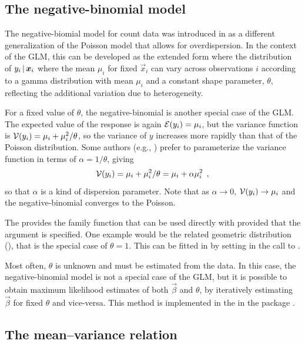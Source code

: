 \documentclass[11pt]{book}\usepackage[]{graphicx}\usepackage[]{color}
\begin{document}
\subsection{The negative-binomial model}\label{sec:glm-negbin}

The negative-biomial model for count data was introduced in 
as a different generalization of the Poisson model that allows for overdispersion. 
In the context of the GLM, this can be developed as the extended form where
the distribution of $y_i \, | \, \bm{x}_i$ where the mean $\mu_i$ for fixed
$\vec{x}_i$ can vary across observations $i$ according to a gamma distribution 
with mean $\mu_i$ and a constant shape parameter, $\theta$, reflecting the
additional variation due to heterogeneity.

For a fixed value of $\theta$, the negative-binomial is another special case of
the GLM.
The expected value of the response is again
$\mathcal{E}(y_i) = \mu_i$, but the variance function is $\mathcal{V}(y_i) = \mu_i + \mu_i^2 / \theta$,
so the variance of $y$ increases more rapidly than that of the Poisson distribution.
Some authors (e.g., \citet{Agresti:2013,Hilbe:2014}) prefer to parameterize the variance
function in terms of $\alpha = 1/\theta$, giving
\begin{equation*}
\mathcal{V}(y_i) = \mu_i + \mu_i^2 / \theta = \mu_i + \alpha \mu_i^2 \:\: ,
\end{equation*}
so that $\alpha$ is a kind of dispersion parameter.  Note that as $\alpha \rightarrow 0$,
$\mathcal{V}(y_i) \rightarrow \mu_i$ and the negative-binomial converges to the Poisson.

The  provides the family function  that
can be used directly with  provided that the argument  is specified.
One example would be the related geometric distribution (),
that is the special case of $\theta=1$. This can be fitted in \R by setting
 in the call to .

Most often, $\theta$ is unknown and must be estimated from the data.
In this case, the negative-binomial model is not a special case of the GLM, 
but it is possible to obtain maximum likelihood estimates of both
$\vec{\beta}$ and $\theta$, by iteratively estimating $\vec{\beta}$ for fixed $\theta$
and vice-versa. This method is implemented in the  in the package .


\subsection{The mean--variance relation}
\end{document}
